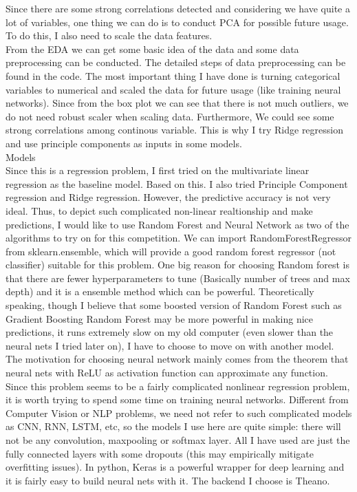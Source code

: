 \documentclass{article}
\begin{document}
\noindent
Since there are some strong correlations detected and considering we have quite a lot of variables, one thing we can do is to conduct PCA for possible future usage. To do this, I also need to scale the data features.\\

\noindent
From the EDA we can get some basic idea of the data and some data preprocessing can be conducted. The detailed steps of data preprocessing can be found in the code. The most important thing I have done is turning categorical variables to numerical and scaled the data for future usage (like training neural networks). Since from the box plot we can see that there is not much outliers, we do not need robust scaler when scaling data. Furthermore, We could see some strong correlations among continous variable. This is why I try Ridge regression and use principle components as inputs in some models.\\


 Models \\

\noindent
Since this is a regression problem, I first tried on the multivariate linear regression as the baseline model. Based on this. I also tried Principle Component regression and Ridge regression.  However, the predictive accuracy is not very ideal. Thus, to depict such complicated non-linear realtionship and make predictions, I would like to use Random Forest and Neural Network as two of the algorithms to try on for this competition. We can import RandomForestRegressor from sklearn.ensemble, which will provide a good random forest regressor (not classifier) suitable for this problem. One big reason for choosing Random forest is that there are fewer hyperparameters to tune (Basically number of trees and max depth) and it is a ensemble method which can be powerful.  Theoretically speaking, though I believe that some boosted version of Random Forest such as Gradient Boosting Random Forest may be more powerful in making nice predictions, it runs extremely slow on my old computer (even slower than the neural nets I tried later on), I have to choose to move on with another model.\\

\noindent
The motivation for choosing neural network mainly comes from the theorem that neural nets with ReLU as activation function can approximate any function. Since this problem seems to be a fairly complicated nonlinear regression problem, it is worth trying to spend some time on training neural networks. Different from Computer Vision or NLP problems, we need not refer to such complicated models as CNN, RNN, LSTM, etc, so the models I use here are quite simple: there will not be any convolution, maxpooling or softmax layer. All I have used are just the fully connected layers with some dropouts (this may empirically mitigate overfitting issues). In python, Keras is a powerful wrapper for deep learning and it is fairly easy to build neural nets with it. The backend I choose is Theano. \\
\end{document}
